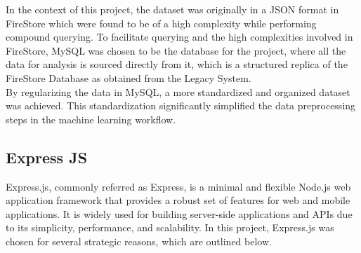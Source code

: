 In the context of this project, the dataset was originally in a JSON format in FireStore which were found to be of a high complexity while performing compound querying. To facilitate querying and the high complexities involved in FireStore,
MySQL was chosen to be the database for the project, where all the data for analysis is sourced directly from it, which is a structured replica of the FireStore Database as obtained from the Legacy System.\\
By regularizing the data in MySQL, a more standardized and organized dataset was achieved. This standardization significantly simplified the data preprocessing steps in the machine learning workflow.


\subsection{Express JS}
Express.js, commonly referred as Express, is a minimal and flexible Node.js web application framework that provides a robust set of features for web and mobile applications. It is widely used for building server-side applications and APIs due to its simplicity, performance, and scalability. In this project, Express.js was chosen for several strategic reasons, which are outlined below.\cite{express}

